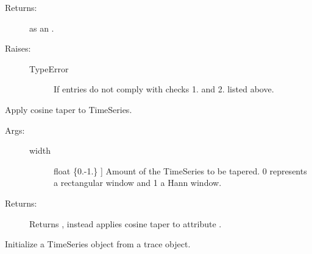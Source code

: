\documentclass[letterpaper,10pt,english]{sphinxmanual}
\begin{document}
\begin{fulllineitems}
\begin{fulllineitems}
\begin{description}
\begin{description}
\end{description}

\item[{Returns:}] \leavevmode
{} as an .

\item[{Raises:}] \leavevmode\begin{description}
\item[{TypeError}] \leavevmode
If entries do not comply with checks 1. and 2. listed 
above.

\end{description}

\end{description}

\end{fulllineitems}


\begin{fulllineitems}
\label{\detokenize{index:sigpropy.TimeSeries.cosine_taper}}
Apply cosine taper to TimeSeries.
\begin{description}
\item[{Args:}] \leavevmode\begin{description}
\item[{width}] \leavevmode{[}float \{0.-1.\} {]}
Amount of the TimeSeries to be tapered. 0 represents a 
rectangular window and 1 a Hann window.

\end{description}

\item[{Returns:}] \leavevmode
Returns , instead applies cosine taper to attribute
.

\end{description}

\end{fulllineitems}


\begin{fulllineitems}
\label{\detokenize{index:sigpropy.TimeSeries.from_trace}}
Initialize a TimeSeries object from a trace object.


\end{fulllineitems}
\end{fulllineitems}
\end{document}
